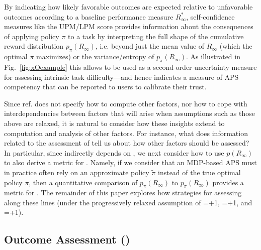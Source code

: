 By indicating how likely favorable outcomes are expected relative to unfavorable outcomes according to a baseline performance measure $R^*_{\infty}$, self-confidence measures like the UPM/LPM score provides information about the consequences of applying policy $\pi$ to a task by interpreting the full shape of the cumulative reward distribution $p_{\pi}(R_{\infty})$, i.e. beyond just the mean value of $R_{\infty}$ (which the optimal $\pi$ maximizes) or the variance/entropy of $p_{\pi}(R_{\infty})$. As illustrated in Fig.~\ref{fig:xOexample} this allows \xO{} to be used as a second-order uncertainty measure for assessing intrinsic task difficulty---and hence indicates a measure of APS competency that can be reported to users to calibrate their trust. %

 Since ref. \cite{Aitken2016-cv} does not specify how to compute other factors, nor how to cope with interdependencies between factors that will arise when assumptions such as those above are relaxed, it is natural to consider how these insights extend to computation and analysis of other \famsec{} factors. For instance, what does information related to the assessment of \xO{} tell us about how other factors should be assessed? In particular, since \xO indirectly depends on \xQ, we next consider how to use $p(R_{\infty})$ to also derive a metric for \xQ. Namely, if we consider that an MDP-based APS must in practice often rely on an approximate policy $\tilde{\pi}$ instead of the true optimal policy $\pi$, then a quantitative comparison of $p_{\tilde{\pi}}(R_{\infty})$ to $p_{\pi}(R_{\infty})$ provides a metric for \xQ. The remainder of this paper explores how strategies for assessing \xQ along these lines (under the progressively relaxed assumption of \xM{}=+1, \xP{}=+1, and \xI{}=+1). 

\subsection{Outcome Assessment (\xP)} \label{sec:OA}

